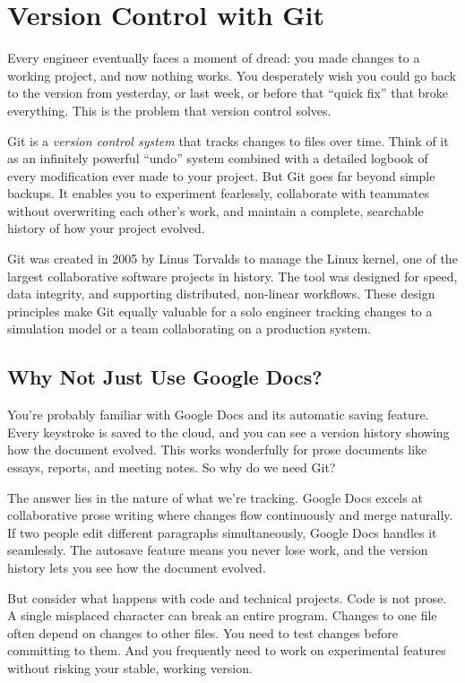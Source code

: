 \documentclass[
  letterpaper,
  DIV=11,
  numbers=noendperiod]{scrreprt}
\begin{document}
\chapter{Version Control with Git}\label{sec-git}

Every engineer eventually faces a moment of dread: you made changes to a
working project, and now nothing works. You desperately wish you could
go back to the version from yesterday, or last week, or before that
``quick fix'' that broke everything. This is the problem that version
control solves.

Git is a \emph{version control system} that tracks changes to files over
time. Think of it as an infinitely powerful ``undo'' system combined
with a detailed logbook of every modification ever made to your project.
But Git goes far beyond simple backups. It enables you to experiment
fearlessly, collaborate with teammates without overwriting each other's
work, and maintain a complete, searchable history of how your project
evolved.

Git was created in 2005 by Linus Torvalds to manage the Linux kernel,
one of the largest collaborative software projects in history. The tool
was designed for speed, data integrity, and supporting distributed,
non-linear workflows. These design principles make Git equally valuable
for a solo engineer tracking changes to a simulation model or a team
collaborating on a production system.

\section{Why Not Just Use Google
Docs?}\label{why-not-just-use-google-docs}

You're probably familiar with Google Docs and its automatic saving
feature. Every keystroke is saved to the cloud, and you can see a
version history showing how the document evolved. This works wonderfully
for prose documents like essays, reports, and meeting notes. So why do
we need Git?

The answer lies in the nature of what we're tracking. Google Docs excels
at collaborative prose writing where changes flow continuously and merge
naturally. If two people edit different paragraphs simultaneously,
Google Docs handles it seamlessly. The autosave feature means you never
lose work, and the version history lets you see how the document
evolved.

But consider what happens with code and technical projects. Code is not
prose. A single misplaced character can break an entire program. Changes
to one file often depend on changes to other files. You need to test
changes before committing to them. And you frequently need to work on
experimental features without risking your stable, working version.
\end{document}
